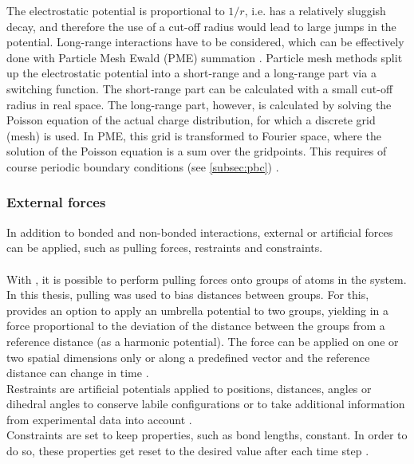 The electrostatic potential is proportional to $1/r$, i.e. has a relatively sluggish decay, and therefore the use of a cut-off radius would lead to large jumps in the potential. Long-range interactions have to be considered, which can be effectively done with Particle Mesh Ewald (PME) summation \autocite{pme}. Particle mesh methods split up the electrostatic potential into a short-range and a long-range part via a switching function. The short-range part can be calculated with a small cut-off radius in real space. The long-range part, however, is calculated by solving the Poisson equation of the actual charge distribution, for which a discrete grid (mesh) is used. In PME, this grid is transformed to Fourier space, where the solution of the Poisson equation is a sum over the gridpoints. This requires of course periodic boundary conditions (see \autoref*{subsec:pbc}) \autocite[p. 246-251]{greenBook}.
\subsubsection{External forces}
In addition to bonded and non-bonded interactions, external or artificial forces can be applied, such as pulling forces, restraints and constraints.\\
\\
With \gromacs{}, it is possible to perform pulling forces onto groups of atoms in the system. In this thesis, pulling was used to bias distances between groups. For this, \gromacs{} provides an option to apply an umbrella potential to two groups, yielding in a force proportional to the deviation of the distance between the groups from a reference distance (as a harmonic potential). The force can be applied on one or two spatial dimensions only or along a predefined vector and the reference distance can change in time  \autocite[p. 154-159]{gromacsManual}.\\
Restraints are artificial potentials applied to positions, distances, angles or dihedral angles to conserve labile configurations or to take additional information from experimental data into account \autocite[p. 84f]{gromacsManual}.\\
Constraints are set to keep properties, such as bond lengths, constant. In order to do so, these properties get reset to the desired value after each time step \autocite[p. 44f]{gromacsManual}. %

